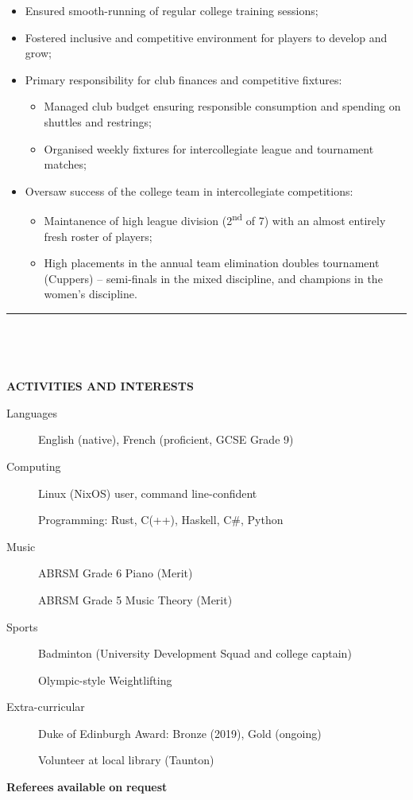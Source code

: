 \documentclass[
  11pt,
  a4paper,
]{article}
\providecommand{\tightlist}{%
  \setlength{\itemsep}{0pt}\setlength{\parskip}{0pt}}
\newcommand{\itemspace}{0.8ex}
\newcommand{\ruledheader}[2]{%
\begingroup
\setlength{\fboxsep}{0pt}%
\colorbox{#1}{%
\parbox[b][1.2ex][t]{35mm}{\begin{tiny}\ \end{tiny}}}%
\parbox[b][1.2ex][t]{5mm}{\begin{tiny}\ \end{tiny}}%
\uppercase{\textbf{#2}}
\endgroup}
\begin{document}
\begin{itemize}
\tightlist
\item
  Ensured smooth-running of regular college training sessions;
\item
  Fostered inclusive and competitive environment for players to develop
  and grow;
\item
  Primary responsibility for club finances and competitive fixtures:

  \begin{itemize}
  \tightlist
  \item
    Managed club budget ensuring responsible consumption and spending on
    shuttles and restrings;
  \item
    Organised weekly fixtures for intercollegiate league and tournament
    matches;
  \end{itemize}
\item
  Oversaw success of the college team in intercollegiate competitions:

  \begin{itemize}
  \tightlist
  \item
    Maintanence of high league division (2\textsuperscript{nd} of 7)
    with an almost entirely fresh roster of players;
  \item
    High placements in the annual team elimination doubles tournament
    (Cuppers) – semi-finals in the mixed discipline, and champions in
    the women’s discipline.
  \end{itemize}
\end{itemize}

\begin{Large}

\vspace{-1.5ex}\rule{\textwidth}{0.8pt}\vspace{2ex}

\ruledheader{cyan!50!teal}{Activities and Interests}\end{Large}

\vspace{\itemspace}

\begin{description}
\item[Languages]
English (native), French (proficient, GCSE Grade 9)
\item[Computing]
Linux (NixOS) user, command line-confident

Programming: Rust, C(++), Haskell, C\#, Python
\item[Music]
ABRSM Grade 6 Piano (Merit)

ABRSM Grade 5 Music Theory (Merit)
\item[Sports]
Badminton (University Development Squad and college captain)

Olympic-style Weightlifting
\item[Extra-curricular]
Duke of Edinburgh Award: Bronze (2019), Gold (ongoing)

Volunteer at local library (Taunton)
\end{description}

\vspace{2.0ex}\begin{center}

\textbf{Referees} \textbf{available} \textbf{on} \textbf{request}

\end{center}
\end{document}
